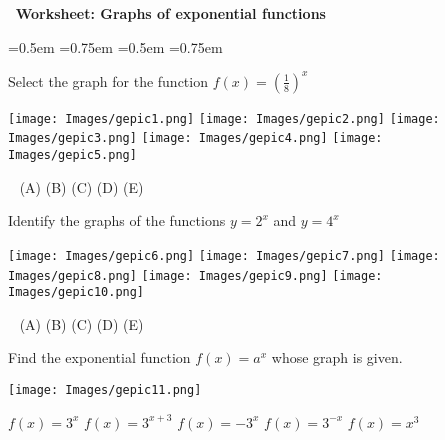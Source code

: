 \documentclass[12pt,
]{exam}
\newcounter{quest}
\newcommand{\worksheetdate}{ 2024}
\newcommand{\coursetitle}{}
\newcommand{\worksheettitle}{Graphs of exponential functions}
\begin{document}

\begin{center}	
{\bf {\coursetitle\,  Worksheet: \worksheettitle} 
	\\ 
	\textbf{}
	\hphantom{\worksheetdate}
} 		
	\end{center}




\begin{questions}

\abovedisplayshortskip=0.5em
\belowdisplayshortskip=0.75em
\abovedisplayskip=0.5em
\belowdisplayskip=0.75em

\question
 Select the graph for the  function $f(x)=(\frac{1}{8})^x$
 
         \texttt{[image: Images/gepic1.png]}
     \texttt{[image: Images/gepic2.png]}
          \texttt{[image: Images/gepic3.png]}
               \texttt{[image: Images/gepic4.png]}
                    \texttt{[image: Images/gepic5.png]}
   
  ~\hspace{1cm} (A) \hspace{2.5cm} (B)  \hspace{2.8cm} (C) \hspace{3cm} (D) \hspace{3cm} (E)
 
 \question
  Identify the graphs of the functions $y=2^x$ and  $y=4^x$
  
    \texttt{[image: Images/gepic6.png]}
     \texttt{[image: Images/gepic7.png]}
          \texttt{[image: Images/gepic8.png]}
               \texttt{[image: Images/gepic9.png]}
                    \texttt{[image: Images/gepic10.png]}
   
  ~\hspace{1cm} (A) \hspace{2.5cm} (B)  \hspace{2.8cm} (C) \hspace{3cm} (D) \hspace{3cm} (E)


\question
Find the exponential function $f(x)=a^x$ whose graph is given.
\begin{multicols}{2}
\begin{center}
       \texttt{[image: Images/gepic11.png]}
 \end{center}
\columnbreak
\begin{choices}
\choice $f(x)=3^x$
\choice $f(x)=3^{x+3}$
\choice $f(x)=-3^{x}$
\choice $f(x)=3^{-x}$
\choice $f(x)=x^3$
\end{choices}


\end{multicols}
\end{questions}
\end{document}
